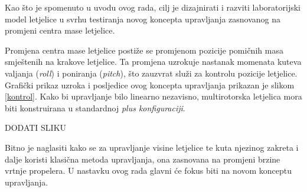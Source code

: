 \documentclass[11pt,a4paper]{article}
\begin{document}
Kao što je spomenuto u uvodu ovog rada, cilj je dizajnirati i razviti laboratorijski model letjelice u svrhu testiranja novog koncepta upravljanja zasnovanog na promjeni centra mase letjelice. 

\medskip

Promjena centra mase letjelice postiže se promjenom pozicije pomičnih masa smještenih na krakove letjelice. Ta promjena uzrokuje nastanak momenata kuteva  valjanja (\textit{roll}) i poniranja (\textit{pitch}), što zauzvrat služi za kontrolu pozicije letjelice. Grafički prikaz uzroka i posljedice ovog koncepta upravljanja prikazan je slikom \ref{kontrol}. Kako bi upravljanje bilo linearno nezavisno, multirotorska letjelica mora biti konstruirana u standardnoj \textit{plus konfiguraciji}. \cite{haus1}

\bigskip
DODATI SLIKU

Bitno je naglasiti kako se za upravljanje visine letjelice te kuta njezinog zakreta i dalje koristi klasična metoda upravljanja, ona zasnovana na promjeni brzine vrtnje propelera. U nastavku ovog rada glavni će fokus biti na novom konceptu upravljanja. 
\end{document}
